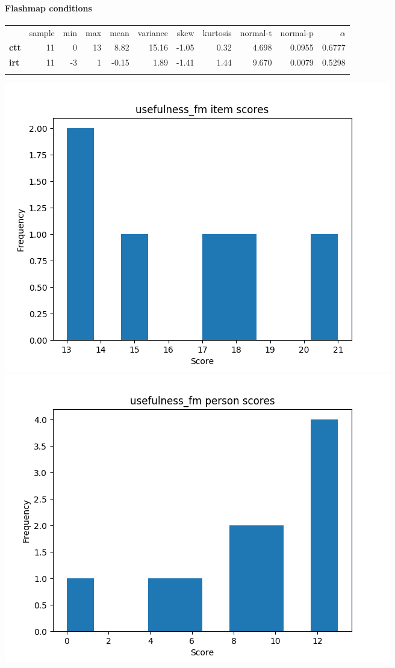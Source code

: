 \documentclass[]{article}
\begin{document}
\FloatBarrier
\paragraph{Flashmap conditions}\label{flashmap-conditions-5}

\begin{longtable}[c]{@{}lrrrrrrrrrr@{}}
\toprule\addlinespace
& sample & min & max & mean & variance & skew & kurtosis & normal-t &
normal-p & $\alpha$
\\\addlinespace
\midrule\endhead
\textbf{ctt} & 11 & 0 & 13 & 8.82 & 15.16 & -1.05 & 0.32 & 4.698 &
0.0955 & 0.6777
\\\addlinespace
\textbf{irt} & 11 & -3 & 1 & -0.15 & 1.89 & -1.41 & 1.44 & 9.670 &
0.0079 & 0.5298
\\\addlinespace
\bottomrule
\end{longtable}

\includegraphics{usefulness_fm_diff.png}
\includegraphics{usefulness_fm_abil.png}
\end{document}
